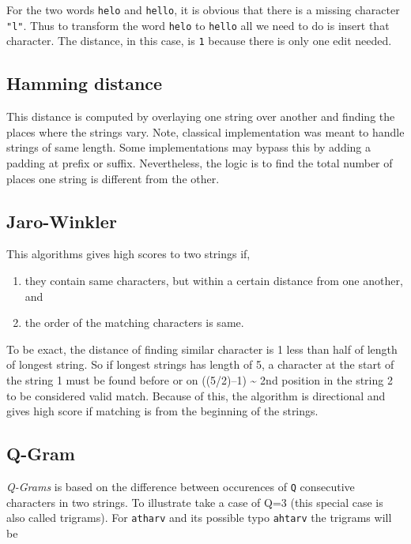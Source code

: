 \documentclass[
]{book}
\providecommand{\tightlist}{%
  \setlength{\itemsep}{0pt}\setlength{\parskip}{0pt}}
\begin{document}
For the two words \texttt{helo} and \texttt{hello}, it is obvious that there is a missing character \texttt{"l"}. Thus to transform the word \texttt{helo} to \texttt{hello} all we need to do is insert that character. The distance, in this case, is \texttt{1} because there is only one edit needed.

\hypertarget{hamming-distance}{%
\subsection{Hamming distance}\label{hamming-distance}}

This distance is computed by overlaying one string over another and finding the places where the strings vary. Note, classical implementation was meant to handle strings of same length. Some implementations may bypass this by adding a padding at prefix or suffix. Nevertheless, the logic is to find the total number of places one string is different from the other.

\hypertarget{jaro-winkler}{%
\subsection{Jaro-Winkler}\label{jaro-winkler}}

This algorithms gives high scores to two strings if,

\begin{enumerate}
\def\labelenumi{\arabic{enumi}.}
\tightlist
\item
  they contain same characters, but within a certain distance from one another, and
\item
  the order of the matching characters is same.
\end{enumerate}

To be exact, the distance of finding similar character is 1 less than half of length of longest string. So if longest strings has length of 5, a character at the start of the string 1 must be found before or on ((5/2)--1) \textasciitilde{} 2nd position in the string 2 to be considered valid match. Because of this, the algorithm is directional and gives high score if matching is from the beginning of the strings.

\hypertarget{q-gram}{%
\subsection{Q-Gram}\label{q-gram}}

\emph{Q-Grams} is based on the difference between occurences of \texttt{Q} consecutive characters in two strings. To illustrate take a case of Q=3 (this special case is also called trigrams). For \texttt{atharv} and its possible typo \texttt{ahtarv} the trigrams will be
\end{document}

